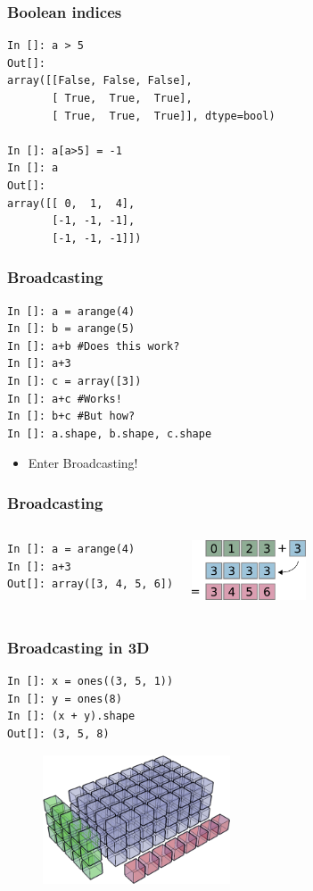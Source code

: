 \documentclass[14pt,compress]{beamer}
\begin{document}
\begin{frame}[fragile]
  \frametitle{Boolean indices}
  \begin{lstlisting}
In []: a > 5
Out[]: 
array([[False, False, False],
       [ True,  True,  True],
       [ True,  True,  True]], dtype=bool)

In []: a[a>5] = -1
In []: a
Out[]: 
array([[ 0,  1,  4],
       [-1, -1, -1],
       [-1, -1, -1]])
  \end{lstlisting}
\end{frame}


\begin{frame}[fragile]
  \frametitle{Broadcasting}
  \begin{lstlisting}
In []: a = arange(4)
In []: b = arange(5)
In []: a+b #Does this work?
In []: a+3
In []: c = array([3])
In []: a+c #Works!
In []: b+c #But how?
In []: a.shape, b.shape, c.shape
  \end{lstlisting}
  \begin{itemize}
    \item Enter Broadcasting!
  \end{itemize}
\end{frame}

\begin{frame}[fragile]
  \frametitle{Broadcasting}
  \begin{columns}
    \hspace*{-1.5in}
    \begin{lstlisting}
In []: a = arange(4)
In []: a+3
Out[]: array([3, 4, 5, 6])
    \end{lstlisting}
    \includegraphics[height=0.7in, interpolate=true]{data/broadcast_scalar}
  \end{columns}
\end{frame}

\begin{frame}[fragile]
  \frametitle{Broadcasting in 3D}
    \begin{lstlisting}
In []: x = ones((3, 5, 1))
In []: y = ones(8)
In []: (x + y).shape
Out[]: (3, 5, 8)
    \end{lstlisting}
    \begin{figure}
      \begin{center}
      \includegraphics[height=1.5in, interpolate=true]{data/array_3x5x8}        
      \end{center}
    \end{figure}
\end{frame}
\end{document}
